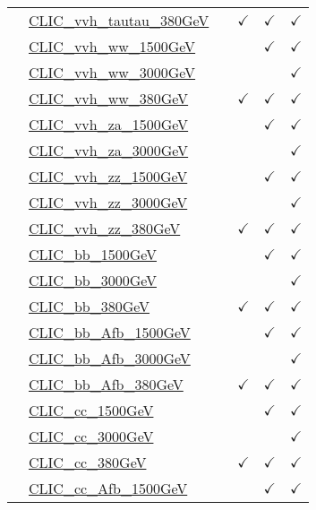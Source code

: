 \documentclass{article}
\begin{document}
\begin{longtable}{|c|l|c|c|c|c|}
 & \href{https://arxiv.org}{CLIC_vvh_tautau_380GeV}  &  & $\checkmark$ & $\checkmark$ & $\checkmark$\\ \cline{2-6}
 & \href{https://arxiv.org}{CLIC_vvh_ww_1500GeV}  &  &  & $\checkmark$ & $\checkmark$\\ \cline{2-6}
 & \href{https://arxiv.org}{CLIC_vvh_ww_3000GeV}  &  &  &  & $\checkmark$\\ \cline{2-6}
 & \href{https://arxiv.org}{CLIC_vvh_ww_380GeV}  &  & $\checkmark$ & $\checkmark$ & $\checkmark$\\ \cline{2-6}
 & \href{https://arxiv.org}{CLIC_vvh_za_1500GeV}  &  &  & $\checkmark$ & $\checkmark$\\ \cline{2-6}
 & \href{https://arxiv.org}{CLIC_vvh_za_3000GeV}  &  &  &  & $\checkmark$\\ \cline{2-6}
 & \href{https://arxiv.org}{CLIC_vvh_zz_1500GeV}  &  &  & $\checkmark$ & $\checkmark$\\ \cline{2-6}
 & \href{https://arxiv.org}{CLIC_vvh_zz_3000GeV}  &  &  &  & $\checkmark$\\ \cline{2-6}
 & \href{https://arxiv.org}{CLIC_vvh_zz_380GeV}  &  & $\checkmark$ & $\checkmark$ & $\checkmark$\\ \cline{2-6}
 & \href{https://arxiv.org}{CLIC_bb_1500GeV}  &  &  & $\checkmark$ & $\checkmark$\\ \cline{2-6}
 & \href{https://arxiv.org}{CLIC_bb_3000GeV}  &  &  &  & $\checkmark$\\ \cline{2-6}
 & \href{https://arxiv.org}{CLIC_bb_380GeV}  &  & $\checkmark$ & $\checkmark$ & $\checkmark$\\ \cline{2-6}
 & \href{https://arxiv.org}{CLIC_bb_Afb_1500GeV}  &  &  & $\checkmark$ & $\checkmark$\\ \cline{2-6}
 & \href{https://arxiv.org}{CLIC_bb_Afb_3000GeV}  &  &  &  & $\checkmark$\\ \cline{2-6}
 & \href{https://arxiv.org}{CLIC_bb_Afb_380GeV}  &  & $\checkmark$ & $\checkmark$ & $\checkmark$\\ \cline{2-6}
 & \href{https://arxiv.org}{CLIC_cc_1500GeV}  &  &  & $\checkmark$ & $\checkmark$\\ \cline{2-6}
 & \href{https://arxiv.org}{CLIC_cc_3000GeV}  &  &  &  & $\checkmark$\\ \cline{2-6}
 & \href{https://arxiv.org}{CLIC_cc_380GeV}  &  & $\checkmark$ & $\checkmark$ & $\checkmark$\\ \cline{2-6}
 & \href{https://arxiv.org}{CLIC_cc_Afb_1500GeV}  &  &  & $\checkmark$ & $\checkmark$\\ \cline{2-6}

\end{longtable}
\end{document}
